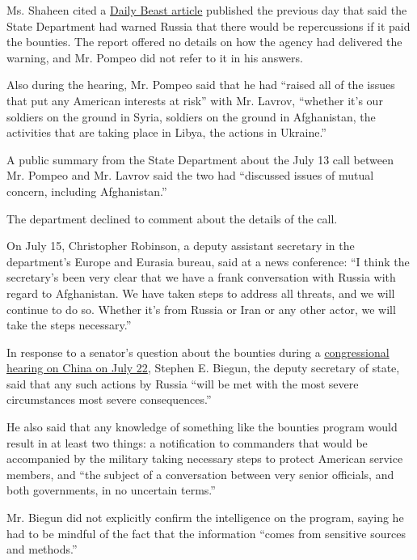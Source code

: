 Ms. Shaheen cited a
\href{https://www.thedailybeast.com/us-warns-russia-on-bounties-while-trump-cries-fake-news?ref=author}{Daily
Beast article} published the previous day that said the State Department
had warned Russia that there would be repercussions if it paid the
bounties. The report offered no details on how the agency had delivered
the warning, and Mr. Pompeo did not refer to it in his answers.

Also during the hearing, Mr. Pompeo said that he had ``raised all of the
issues that put any American interests at risk'' with Mr. Lavrov,
``whether it's our soldiers on the ground in Syria, soldiers on the
ground in Afghanistan, the activities that are taking place in Libya,
the actions in Ukraine.''

A public summary from the State Department about the July 13 call
between Mr. Pompeo and Mr. Lavrov said the two had ``discussed issues of
mutual concern, including Afghanistan.''

The department declined to comment about the details of the call.

On July 15, Christopher Robinson, a deputy assistant secretary in the
department's Europe and Eurasia bureau, said at a news conference: ``I
think the secretary's been very clear that we have a frank conversation
with Russia with regard to Afghanistan. We have taken steps to address
all threats, and we will continue to do so. Whether it's from Russia or
Iran or any other actor, we will take the steps necessary.''

In response to a senator's question about the bounties during a
\href{https://www.c-span.org/video/?473984-1/senate-foreign-relations-hearing-us-china-relations}{congressional
hearing on China on July 22}, Stephen E. Biegun, the deputy secretary of
state, said that any such actions by Russia ``will be met with the most
severe circumstances most severe consequences.''

He also said that any knowledge of something like the bounties program
would result in at least two things: a notification to commanders that
would be accompanied by the military taking necessary steps to protect
American service members, and ``the subject of a conversation between
very senior officials, and both governments, in no uncertain terms.''

Mr. Biegun did not explicitly confirm the intelligence on the program,
saying he had to be mindful of the fact that the information ``comes
from sensitive sources and methods.''


